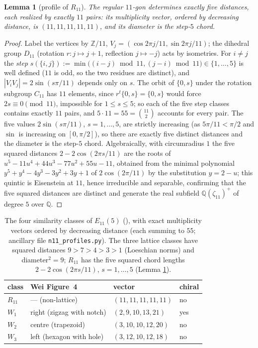 \documentclass[11pt]{article}
\newtheorem{lemma}[theorem]{Lemma}
\theoremstyle{definition}
\theoremstyle{remark}
\newcommand{\Q}{\mathbb{Q}}
\newcommand{\Z}{\mathbb{Z}}
\begin{document}
\begin{lemma}[profile of $R_{11}$]\label{lem:r11}
The regular $11$-gon determines exactly five distances, each realized by exactly $11$
pairs: its multiplicity vector, ordered by decreasing distance, is $(11,11,11,11,11)$,
and its diameter is the step-$5$ chord.
\end{lemma}

\begin{proof}
Label the vertices by $\Z/11$, $V_j = (\cos 2\pi j/11, \sin 2\pi j/11)$; the dihedral
group $D_{11}$ (rotation $r: j \mapsto j+1$, reflection $j \mapsto -j$) acts by isometries.
For $i \ne j$ the \emph{step} $s(\{i,j\}) := \min\bigl((i-j) \bmod 11, (j-i) \bmod 11\bigr)
\in \{1, \dots, 5\}$ is well defined ($11$ is odd, so the two residues are distinct), and
$|V_iV_j| = 2\sin(s\pi/11)$ depends only on $s$. The orbit of $\{0, s\}$ under the rotation
subgroup $C_{11}$ has $11$ elements, since $r^t\{0,s\} = \{0,s\}$ would force
$2s \equiv 0 \pmod{11}$, impossible for $1 \le s \le 5$; so each of the five step classes
contains exactly $11$ pairs, and $5 \cdot 11 = 55 = \binom{11}{2}$ accounts for every
pair. The five values $2\sin(s\pi/11)$, $s = 1, \dots, 5$, are strictly increasing (as
$5\pi/11 < \pi/2$ and $\sin$ is increasing on $[0,\pi/2]$), so there are exactly five
distinct distances and the diameter is the step-$5$ chord. Algebraically, with
circumradius $1$ the five squared distances $2 - 2\cos(2\pi s/11)$ are the roots of
$u^5 - 11u^4 + 44u^3 - 77u^2 + 55u - 11$, obtained from the minimal polynomial
$y^5 + y^4 - 4y^3 - 3y^2 + 3y + 1$ of $2\cos(2\pi/11)$ by the substitution $y = 2 - u$;
this quintic is Eisenstein at $11$, hence irreducible and separable, confirming that the
five squared distances are distinct and generate the real subfield $\Q(\zeta_{11})^+$ of
degree $5$ over $\Q$.
\end{proof}

\begin{table}[ht]
\centering
\caption{The four similarity classes of $E_{11}(5)$ (\cite[Theorem~13]{Wei11}), with
exact multiplicity vectors ordered by decreasing distance (each summing to $55$; ancillary
file \texttt{n11\_profiles.py}). The three lattice classes have squared distances
$9 > 7 > 4 > 3 > 1$ (Loeschian norms) and diameter$^2 = 9$; $R_{11}$ has the five squared
chord lengths $2 - 2\cos(2\pi s/11)$, $s = 1, \dots, 5$ (Lemma \ref{lem:r11}).}
\label{tab:e115}
\begin{tabular}{@{}llll@{}}
\toprule
class & Wei Figure~4 & vector & chiral \\
\midrule
$R_{11}$ & --- (non-lattice) & $(11,11,11,11,11)$ & no \\
$W_1$ & right (zigzag with notch) & $(2,9,10,13,21)$ & yes \\
$W_2$ & centre (trapezoid) & $(3,10,10,12,20)$ & no \\
$W_3$ & left (hexagon with hole) & $(3,12,10,12,18)$ & no \\
\bottomrule
\end{tabular}
\end{table}
\end{document}
